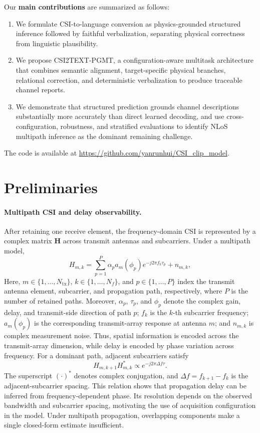 \documentclass[conference]{IEEEtran}
\begin{document}
Our \textbf{main contributions} are summarized as follows:
\begin{enumerate}
\renewcommand{\labelenumi}{\roman{enumi}.}
\item We formulate CSI-to-language conversion as physics-grounded structured inference followed by
faithful verbalization, separating physical correctness from linguistic plausibility.
\item We propose CSI2TEXT-PGMT, a configuration-aware multitask architecture that combines
semantic alignment, target-specific physical branches, relational correction, and deterministic
verbalization to produce traceable channel reports.
\item We demonstrate that structured prediction grounds channel descriptions substantially more
accurately than direct learned decoding, and use cross-configuration, robustness, and stratified
evaluations to identify NLoS multipath inference as the dominant remaining challenge.
\end{enumerate}
The code is available at \url{https://github.com/yanrunhui/CSI_clip_model}.

\section{Preliminaries}

\paragraph{Multipath CSI and delay observability.}
After retaining one receive element, the frequency-domain CSI is represented by a complex matrix
$\mathbf H$ across transmit antennas and subcarriers. Under a multipath model,
\[
H_{m,k}=\sum_{p=1}^{P} \alpha_p a_m(\phi_p)e^{-j2\pi f_k\tau_p}+n_{m,k},
\]
Here, $m\in\{1,\ldots,N_{\mathrm{tx}}\}$, $k\in\{1,\ldots,N_f\}$, and
$p\in\{1,\ldots,P\}$ index the transmit antenna element, subcarrier, and propagation path,
respectively, where $P$ is the number of retained paths. Moreover, $\alpha_p$, $\tau_p$, and
$\phi_p$ denote the complex gain, delay, and transmit-side direction of path $p$; $f_k$ is the
$k$-th subcarrier frequency; $a_m(\phi_p)$ is the corresponding transmit-array response at antenna
$m$; and $n_{m,k}$ is complex measurement noise. Thus, spatial information is encoded across the
transmit-array dimension, while delay is encoded by phase variation across frequency. For a dominant
path, adjacent subcarriers satisfy
\[
H_{m,k+1}H_{m,k}^{*}\propto e^{-j2\pi\Delta f\tau}.
\]
The superscript $(\cdot)^*$ denotes complex conjugation, and
$\Delta f=f_{k+1}-f_k$ is the adjacent-subcarrier spacing. This relation shows that propagation
delay can be inferred from frequency-dependent phase. Its resolution depends on the observed
bandwidth and subcarrier spacing, motivating the use of acquisition configuration in the model.
Under multipath propagation, overlapping components make a single closed-form estimate insufficient.
\end{document}
